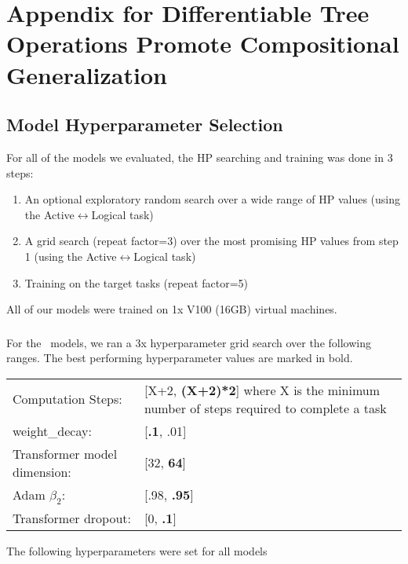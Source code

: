 \chapter{Appendix for Differentiable Tree Operations Promote Compositional Generalization} \label{chap:appendix-b}

\section{Model Hyperparameter Selection}
\raggedbottom

For all of the models we evaluated, the HP searching and training was done in 3 steps:
\begin{enumerate}
   \item An optional exploratory random search over a wide range of HP values (using the Active$\leftrightarrow$Logical task) 
   \item A grid search (repeat factor=3) over the most promising HP values from step 1 (using the Active$\leftrightarrow$Logical task) 
   \item Training on the target tasks (repeat factor=5) 
\end{enumerate}

All of our models were trained on 1x V100 (16GB) virtual machines.  

\subsection{\blackboard} \label{sec:dtm-blackboard-training}
For the \blackboard\ models, we ran a 3x hyperparameter grid search over the following ranges. The best performing hyperparameter values are marked in bold.


\begin{tabular}{ll}
    Computation Steps: & [X+2, \textbf{(X+2)*2}] where X is the minimum number of steps required to complete a task \\  
    weight\_decay: & [\textbf{.1}, .01] \\
    Transformer model dimension: & [32, \textbf{64}] \\
    Adam $\beta_2$: & [.98, \textbf{.95}] \\
    Transformer dropout: & [0, \textbf{.1}] \\
\end{tabular}

The following hyperparameters were set for all models

